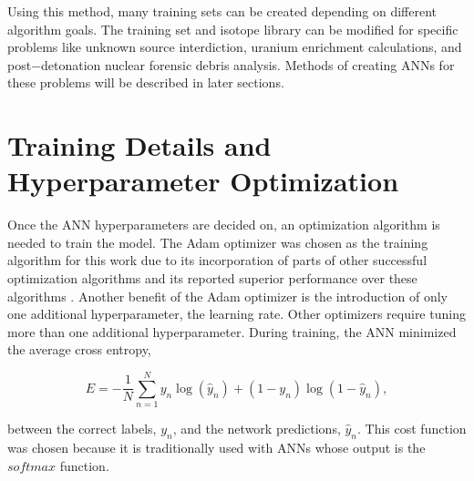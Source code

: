 \documentclass[tocnosub,noragright,centerchapter,12pt,fullpage]{uiucecethesis09}
\begin{document}
Using this method, many training sets can be created depending on different algorithm goals. The training set and isotope library can be modified for specific problems like unknown source interdiction, uranium enrichment calculations, and post$-$detonation nuclear forensic debris analysis. Methods of creating ANNs for these problems will be described in later sections.




\section{Training Details and Hyperparameter Optimization}

Once the ANN hyperparameters are decided on, an optimization algorithm is needed to train the model. The Adam optimizer was chosen as the training algorithm for this work due to its incorporation of parts of other successful optimization algorithms and its reported superior performance over these algorithms \cite{Kingma2015}. Another benefit of the Adam optimizer is the introduction of only one additional hyperparameter, the learning rate. Other optimizers require tuning more than one additional hyperparameter. During training, the ANN minimized the average cross entropy,

\begin{equation} \label{eq:CrossEntropy}
E = -{\frac{1} N} \sum_{n=1}^N y_n \log(\hat{y}_n) +  (1-y_n) \log(1-\hat{y}_n),
\end{equation}

between the correct labels, $y_n$, and the network predictions, $\hat{y}_n$. This cost function was chosen because it is traditionally used with ANNs whose output is the $softmax$ function. 
\end{document}
